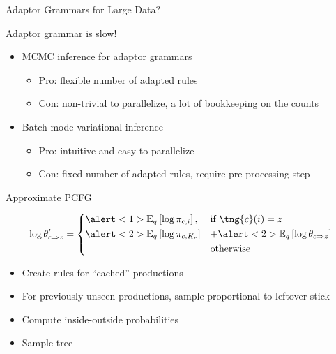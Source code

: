 \documentclass[compress]{beamer}
\newcommand{\e}[2]{\mathbb{E}_{#1}\left[ #2 \right] }
\begin{document}
\begin{frame}{Adaptor Grammars for Large Data?}
  \vspace{-1mm}
  \begin{block}{Adaptor grammar is slow!}
    \begin{itemize}
    \item MCMC inference for adaptor grammars~\cite{johnson-06}
      \begin{itemize}
      \item Pro: flexible number of adapted rules
      \item Con: non-trivial to parallelize, a lot of bookkeeping on
        the counts
      \end{itemize}
    \item Batch mode variational inference~\cite{cohen-10}
      \begin{itemize}
      \item Pro: intuitive and easy to parallelize
      \item Con: fixed number of adapted rules, require pre-processing step
      \end{itemize}
    \end{itemize}
  \end{block}
\end{frame}

\begin{frame}{Approximate PCFG}

\begin{align}
   \log \theta'_{c \Rightarrow z} =
  \begin{dcases}
     \alert<1>{\e{q}{ \log \pi_{c, i} },} & \mbox{if $\tng{c}(i) = z$}  \\
     \alert<2> {\e{q}{\log \pi_{c, K_c}}} & + \alert<2>{\e{q}{\log \theta_{c \Rightarrow z} } } \\
    & \mbox{otherwise}
  \end{dcases}
  \label{eq:approx-pcfg}
\end{align}

\begin{itemize}
  \item \alert<1>{Create rules for ``cached'' productions}
  \item \alert<2>{For previously unseen productions, sample
      proportional to leftover stick}
  \item Compute inside-outside probabilities
  \item Sample tree~\cite{johnson-07}
\end{itemize}

\end{frame}
\end{document}
